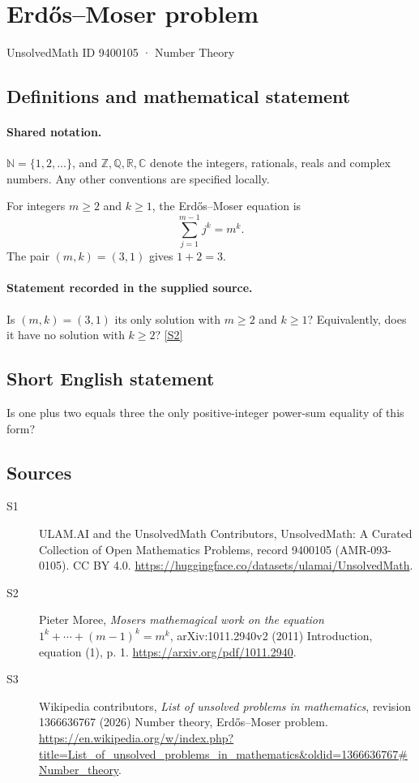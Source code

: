 \documentclass[11pt]{article}
\newcommand{\sref}[2]{\hyperlink{source:#1:#2}{[S#2]}}
\begin{document}
\setcounter{section}{9400104}
\section{Erdős–Moser problem}\label{9400105}
{\small\sffamily UnsolvedMath ID 9400105 · Number Theory}
\subsection{Definitions and mathematical statement}

\paragraph{Shared notation.}$\mathbb N=\{1,2,\ldots\}$, and $\mathbb Z,\mathbb Q,\mathbb R,\mathbb C$ denote the integers, rationals, reals and complex numbers. Any other conventions are specified locally.


For integers $m\ge2$ and $k\ge1$, the Erd\H{o}s--Moser equation is
\[
\sum_{j=1}^{m-1}j^k=m^k.
\]
The pair $(m,k)=(3,1)$ gives $1+2=3$.
\paragraph{Statement recorded in the supplied source.}
Is $(m,k)=(3,1)$ its only solution with $m\ge2$ and $k\ge1$? Equivalently, does it have no solution with $k\ge2$? \sref{9400105}{2}
\subsection{Short English statement}
Is one plus two equals three the only positive-integer power-sum equality of this form?
\subsection{Sources}
\begin{description}
\item[\hypertarget{source:9400105:1}{S1}] ULAM.AI and the UnsolvedMath Contributors, UnsolvedMath: A Curated Collection of Open Mathematics Problems, record 9400105 (AMR-093-0105). CC BY 4.0. \url{https://huggingface.co/datasets/ulamai/UnsolvedMath}.
\item[\hypertarget{source:9400105:2}{S2}] Pieter Moree, \emph{Moser\textquotesingle s mathemagical work on the equation $1^k+\cdots+(m-1)^k=m^k$}, arXiv:1011.2940v2 (2011) Introduction, equation (1), p. 1. \url{https://arxiv.org/pdf/1011.2940}.
\item[\hypertarget{source:9400105:3}{S3}] Wikipedia contributors, \emph{List of unsolved problems in mathematics}, revision 1366636767 (2026) Number theory, Erdős–Moser problem. \url{https://en.wikipedia.org/w/index.php?title=List_of_unsolved_problems_in_mathematics&oldid=1366636767#Number_theory}.
\end{description}
\label{end:9400105}
\end{document}
